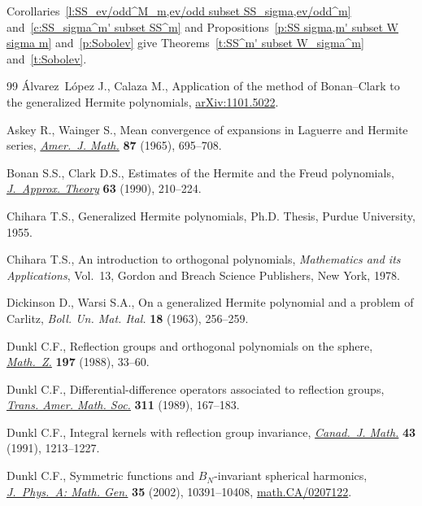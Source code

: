 \documentclass[11pt]{article}
\begin{document}
Corollaries~\ref{l:SS_ev/odd^M_m,ev/odd subset SS_sigma,ev/odd^m} and~\ref{c:SS_sigma^m' subset SS^m} and Propositions~\ref{p:SS sigma,m' subset W sigma m} and~\ref{p:Sobolev} give Theorems~\ref{t:SS^m' subset W_sigma^m} and~\ref{t:Sobolev}.
\begin{thebibliography}{99}
\'Alvarez~L\'opez J., Calaza M., Application of the method of Bonan--Clark to
  the generalized Hermite polynomials, \href{http://arxiv.org/abs/1101.5022}{arXiv:1101.5022}.

Askey R., Wainger S., Mean convergence of expansions in {L}aguerre and
  {H}ermite series, \href{http://dx.doi.org/10.2307/2373069}{\textit{Amer.~J. Math.}} \textbf{87} (1965), 695--708.

Bonan S.S., Clark D.S., Estimates of the {H}ermite and the {F}reud polynomials,
  \href{http://dx.doi.org/10.1016/0021-9045(90)90104-X}{\textit{J.~Approx. Theory}} \textbf{63} (1990), 210--224.

Chihara T.S., Generalized Hermite polynomials, Ph.D. Thesis, Purdue University,
  1955.

Chihara T.S., An introduction to orthogonal polynomials, \textit{Mathematics
  and its Applications}, Vol.~13, Gordon and Breach Science Publishers, New
  York, 1978.

Dickinson D., Warsi S.A., On a generalized {H}ermite polynomial and a problem
  of {C}arlitz, \textit{Boll. Un. Mat. Ital.} \textbf{18} (1963), 256--259.

Dunkl C.F., Ref\/lection groups and orthogonal polynomials on the sphere,
  \href{http://dx.doi.org/10.1007/BF01161629}{\textit{Math.~Z.}} \textbf{197} (1988), 33--60.

Dunkl C.F., Dif\/ferential-dif\/ference operators associated to ref\/lection groups,
  \href{http://dx.doi.org/10.2307/2001022}{\textit{Trans. Amer. Math. Soc.}} \textbf{311} (1989), 167--183.

Dunkl C.F., Integral kernels with ref\/lection group invariance,
  \href{http://dx.doi.org/10.4153/CJM-1991-069-8}{\textit{Canad.~J. Math.}} \textbf{43} (1991), 1213--1227.

Dunkl C.F., Symmetric functions and {$B_N$}-invariant spherical harmonics,
  \href{http://dx.doi.org/10.1088/0305-4470/35/48/312}{\textit{J.~Phys.~A: Math. Gen.}} \textbf{35} (2002), 10391--10408,
  \href{http://arxiv.org/abs/math.CA/0207122}{math.CA/0207122}.


\end{thebibliography}
\end{document}
